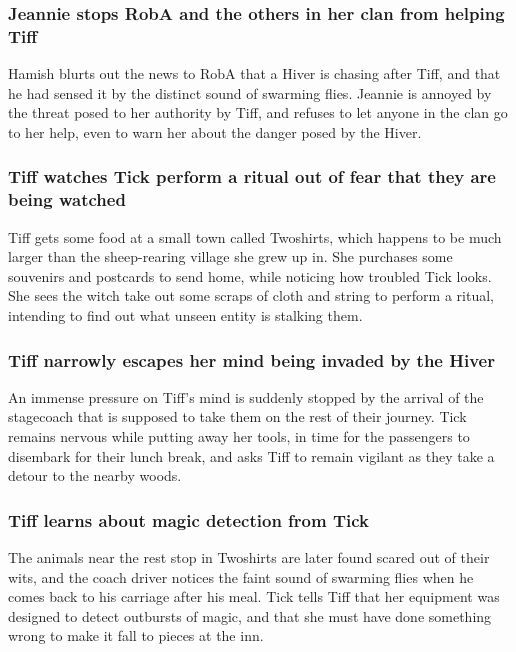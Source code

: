 \subsubsection{\Gls{Jeannie} stops \Gls{RobA} and the others in her clan from helping \Gls{Tiff}}
\Gls{Hamish} blurts out the news to \Gls{RobA} that a \Gls{Hiver} is chasing after \Gls{Tiff}, and
that he had sensed it by the distinct sound of swarming flies. \Gls{Jeannie} is annoyed by the
threat posed to her authority by \Gls{Tiff}, and refuses to let anyone in the clan go to her help,
even to warn her about the danger posed by the \Gls{Hiver}.

\subsubsection{\Gls{Tiff} watches \Gls{Tick} perform a ritual out of fear that they are being
    watched}
\Gls{Tiff} gets some food at a small town called Twoshirts, which happens to be much larger than the
sheep-rearing village she grew up in. She purchases some souvenirs and postcards to send home,
while noticing how troubled \Gls{Tick} looks. She sees the witch take out some scraps of cloth and
string to perform a ritual, intending to find out what unseen entity is stalking them.

\subsubsection{\Gls{Tiff} narrowly escapes her mind being invaded by the \Gls{Hiver}}
An immense pressure on \Gls{Tiff}'s mind is suddenly stopped by the arrival of the stagecoach that
is supposed to take them on the rest of their journey. \Gls{Tick} remains nervous while putting
away her tools, in time for the passengers to disembark for their lunch break, and asks \Gls{Tiff}
to remain vigilant as they take a detour to the nearby woods.

\subsubsection{\Gls{Tiff} learns about magic detection from \Gls{Tick}}
The animals near the rest stop in Twoshirts are later found scared out of their wits, and the
coach driver notices the faint sound of swarming flies when he comes back to his carriage after his
meal. \Gls{Tick} tells \Gls{Tiff} that her equipment was designed to detect outbursts of magic, and
that she must have done something wrong to make it fall to pieces at the inn.

